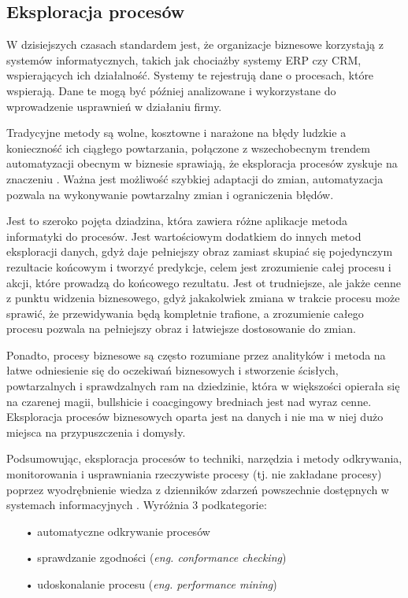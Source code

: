 \subsection{Eksploracja procesów}

W dzisiejszych czasach standardem jest, że organizacje biznesowe korzystają z systemów informatycznych, takich jak chociażby systemy ERP czy CRM, wspierających ich działalność. Systemy te rejestrują dane o procesach, które wspierają. Dane te mogą być później analizowane i wykorzystane do wprowadzenie usprawnień w działaniu firmy.   

Tradycyjne metody są wolne, kosztowne i narażone na błędy ludzkie a konieczność ich ciągłego powtarzania, połączone z wszechobecnym trendem automatyzacji obecnym w biznesie sprawiają, że eksploracja procesów zyskuje na znaczeniu \cite{market-pm}. Ważna jest możliwość szybkiej adaptacji do zmian, automatyzacja pozwala na wykonywanie powtarzalny zmian i ograniczenia błędów.

Jest to szeroko pojęta dziadzina, która zawiera różne aplikacje metoda informatyki do procesów. 
Jest wartościowym dodatkiem do innych metod eksploracji danych, gdyż daje pełniejszy obraz zamiast skupiać się pojedynczym rezultacie końcowym i tworzyć predykcje, celem jest zrozumienie całej procesu i akcji, które prowadzą do końcowego rezultatu. Jest ot trudniejsze, ale jakże cenne z punktu widzenia biznesowego, gdyż jakakolwiek zmiana w trakcie procesu może sprawić, że przewidywania będą kompletnie trafione, a zrozumienie całego procesu pozwala na pełniejszy obraz i łatwiejsze dostosowanie do zmian. 

Ponadto, procesy biznesowe są często rozumiane przez analityków i metoda na łatwe odniesienie się do oczekiwań biznesowych i stworzenie ścisłych, powtarzalnych i sprawdzalnych ram na dziedzinie, która w większości opierała się na czarenej magii, bullshicie i coacgingowy bredniach jest nad wyraz cenne. Eksploracja procesów biznesowych oparta jest na danych i nie ma w niej dużo miejsca na przypuszczenia i domysły.

Podsumowując, eksploracja procesów to techniki, narzędzia i
metody odkrywania, monitorowania i
usprawniania rzeczywiste procesy (tj. nie
zakładane procesy) poprzez wyodrębnienie
wiedza z dzienników zdarzeń powszechnie
dostępnych w systemach informacyjnych \cite{pm-manifesto}\cite{mining-overview}.
Wyróżnia 3 podkategorie: 
\begin{itemize}
  \item[•] automatyczne odkrywanie procesów
  \item[•] sprawdzanie zgodności (\textit{eng. conformance checking})
  \item[•] udoskonalanie procesu (\textit{eng. performance mining})
\end{itemize}


